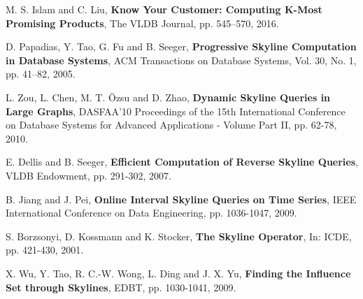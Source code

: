 \begin{thebibliography}{9}
	M. S. Islam and C. Liu, \textbf{Know Your Customer: Computing K-Most Promising Products}, The VLDB Journal, pp. 545–570, 2016.
	
	D. Papadias, Y. Tao, G. Fu and B. Seeger, \textbf{Progressive Skyline Computation in Database Systems}, ACM Transactions on Database Systems, Vol. 30, No. 1, pp. 41–82, 2005.
	
	L. Zou, L. Chen, M. T. Özsu and D. Zhao, \textbf{Dynamic Skyline Queries in Large Graphs}, DASFAA'10 Proceedings of the 15th International Conference on Database Systems for Advanced Applications - Volume Part II, pp. 62-78, 2010.
	
	E. Dellis and B. Seeger, \textbf{Efficient Computation of Reverse Skyline Queries}, VLDB Endowment, pp. 291-302, 2007.
	
	B. Jiang and J. Pei, \textbf{Online Interval Skyline Queries on Time Series}, IEEE International Conference on Data Engineering, pp. 1036-1047, 2009.
	
	S. Borzsonyi, D. Kossmann and K. Stocker, \textbf{The Skyline Operator}, In: ICDE, pp. 421-430, 2001.
	
	X. Wu, Y. Tao, R. C.-W. Wong, L. Ding and J. X. Yu, \textbf{Finding the Influence Set through Skylines}, EDBT, pp. 1030-1041, 2009.
		
\end{thebibliography}
